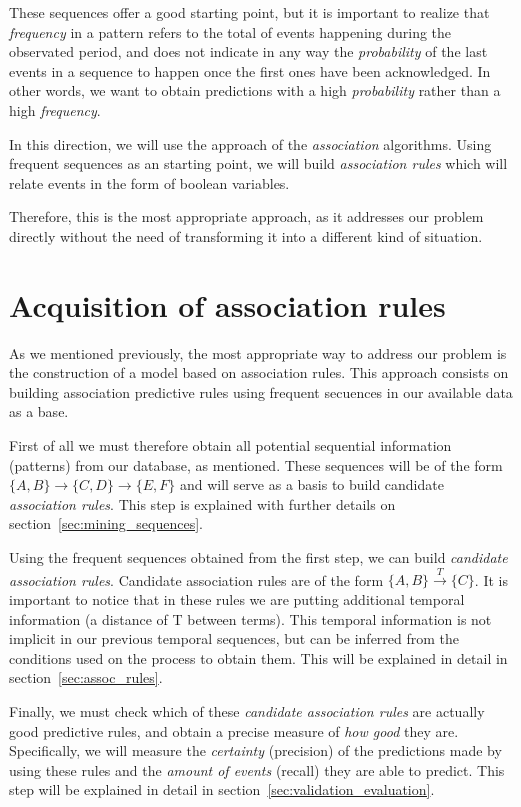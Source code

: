 \documentclass[a4paper,12pt]{article}
\begin{document}
These sequences offer a good starting point, but it is important to realize that \emph{frequency} in a pattern refers to the total of events happening during the observated period, and does not indicate in any way the \emph{probability} of the last events in a sequence to happen once the first ones have been acknowledged. In other words, we want to obtain predictions with a high \emph{probability} rather than a high \emph{frequency}.

In this direction, we will use the approach of the \emph{association} algorithms. Using frequent sequences as an starting point, we will build \emph{association rules} which will relate events in the form of boolean variables.

Therefore, this is the most appropriate approach, as it addresses our problem directly without the need of transforming it into a different kind of situation.

\section{Acquisition of association rules}
\label{sec:rule_model}
As we mentioned previously, the most appropriate way to address our problem is the construction of a model based on association rules. This approach consists on building association predictive rules using frequent secuences in our available data as a base.

First of all we must therefore obtain all potential sequential information (patterns) from our database, as mentioned. These sequences will be of the form $\{A, B\} \longrightarrow \{C, D\} \longrightarrow \{E, F\}$ and will serve as a basis to build candidate \emph{association rules}. This step is explained with further details on section~\ref{sec:mining_sequences}.

Using the frequent sequences obtained from the first step, we can build \emph{candidate association rules}. Candidate association rules are of the form $\{A, B\} \xrightarrow{T} \{C\}$. It is important to notice that in these rules we are putting additional temporal information (a distance of T between terms). This temporal information is not implicit in our previous temporal sequences, but can be inferred from the conditions used on the process to obtain them. This will be explained in detail in section~\ref{sec:assoc_rules}.

Finally, we must check which of these \emph{candidate association rules} are actually good predictive rules, and obtain a precise measure of \emph{how good} they are. Specifically, we will measure the \emph{certainty} (precision) of the predictions made by using these rules and the \emph{amount of events} (recall) they are able to predict. This step will be explained in detail in section~\ref{sec:validation_evaluation}.
\end{document}
